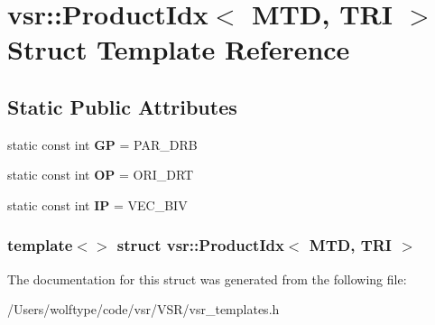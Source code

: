 \hypertarget{structvsr_1_1_product_idx_3_01_m_t_d_00_01_t_r_i_01_4}{\section{vsr\-:\-:Product\-Idx$<$ M\-T\-D, T\-R\-I $>$ Struct Template Reference}
\label{structvsr_1_1_product_idx_3_01_m_t_d_00_01_t_r_i_01_4}
}
\subsection*{Static Public Attributes}
\begin{DoxyCompactItemize}
\item 
\hypertarget{structvsr_1_1_product_idx_3_01_m_t_d_00_01_t_r_i_01_4_a67d33a2f8570680e25d1e9194096f6fe}{static const int {\bfseries G\-P} = P\-A\-R\-\_\-\-D\-R\-B}\label{structvsr_1_1_product_idx_3_01_m_t_d_00_01_t_r_i_01_4_a67d33a2f8570680e25d1e9194096f6fe}

\item 
\hypertarget{structvsr_1_1_product_idx_3_01_m_t_d_00_01_t_r_i_01_4_a3fdd4f34e3fa8153f8901f4599bf7a6a}{static const int {\bfseries O\-P} = O\-R\-I\-\_\-\-D\-R\-T}\label{structvsr_1_1_product_idx_3_01_m_t_d_00_01_t_r_i_01_4_a3fdd4f34e3fa8153f8901f4599bf7a6a}

\item 
\hypertarget{structvsr_1_1_product_idx_3_01_m_t_d_00_01_t_r_i_01_4_afa2037e2a77e2844e823bfefcc602c81}{static const int {\bfseries I\-P} = V\-E\-C\-\_\-\-B\-I\-V}\label{structvsr_1_1_product_idx_3_01_m_t_d_00_01_t_r_i_01_4_afa2037e2a77e2844e823bfefcc602c81}

\end{DoxyCompactItemize}
\subsubsection*{template$<$$>$ struct vsr\-::\-Product\-Idx$<$ M\-T\-D, T\-R\-I $>$}



The documentation for this struct was generated from the following file\-:\begin{DoxyCompactItemize}
\item 
/\-Users/wolftype/code/vsr/\-V\-S\-R/vsr\-\_\-templates.\-h\end{DoxyCompactItemize}
